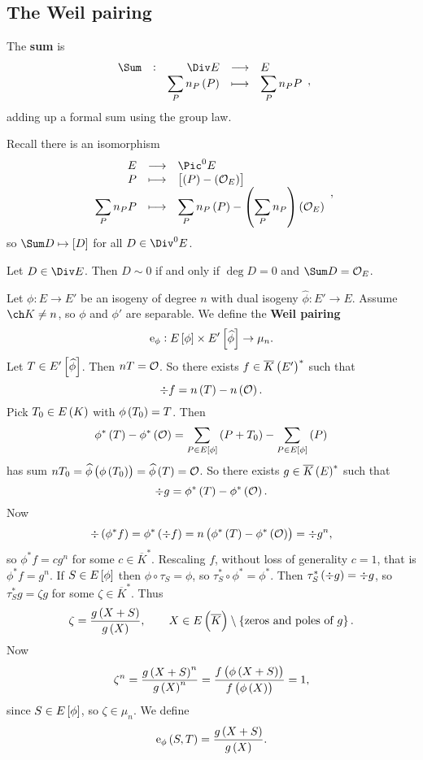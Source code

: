 \pagebreak

\subsection{The Weil pairing}


\begin{definition*}
The \textbf{sum} is
$$ \function[\Sum]{\Div E}{E}{\sum_P n_P\br{P}}{\sum_P n_PP}, $$
adding up a formal sum using the group law.
\end{definition*}

Recall there is an isomorphism
$$ \functions{E}{\Pic^0 E}{P}{\sbr{\br{P} - \br{\OOO_E}}}{\sum_P n_PP}{\sum_P n_P\br{P} - \br{\sum_P n_P}\br{\OOO_E}}, $$
so $ \Sum D \mapsto \sbr{D} $ for all $ D \in \Div^0 E $.

\begin{lemma}
Let $ D \in \Div E $. Then $ D \sim 0 $ if and only if $ \deg D = 0 $ and $ \Sum D = \OOO_E $.
\end{lemma}

Let $ \phi : E \to E' $ be an isogeny of degree $ n $ with dual isogeny $ \widehat{\phi} : E' \to E $. Assume $ \ch K \ne n $, so $ \phi $ and $ \phi' $ are separable. We define the \textbf{Weil pairing}
$$ \e_\phi : E\sbr{\phi} \times E'\sbr{\widehat{\phi}} \to \mu_n. $$
Let $ T \in E'\sbr{\widehat{\phi}} $. Then $ nT = \mathcal{O} $. So there exists $ f \in \overline{K}\br{E'}^* $ such that
$$ \div f = n\br{T} - n\br{\OOO}. $$
Pick $ T_0 \in E\br{K} $ with $ \phi\br{T_0} = T $. Then
$$ \phi^*\br{T} - \phi^*\br{\OOO} = \sum_{P \in E\sbr{\phi}} \br{P + T_0} - \sum_{P \in E\sbr{\phi}} \br{P} $$
has sum $ nT_0 = \widehat{\phi}\br{\phi\br{T_0}} = \widehat{\phi}\br{T} = \OOO $. So there exists $ g \in \overline{K}\br{E}^* $ such that
$$ \div g = \phi^*\br{T} - \phi^*\br{\OOO}. $$
Now
$$ \div \br{\phi^*f} = \phi^*\br{\div f} = n\br{\phi^*\br{T} - \phi^*\br{\OOO}} = \div g^n, $$
so $ \phi^*f = cg^n $ for some $ c \in \overline{K}^* $. Rescaling $ f $, without loss of generality $ c = 1 $, that is $ \phi^*f = g^n $. If $ S \in E\sbr{\phi} $ then $ \phi \circ \tau_S = \phi $, so $ \tau_S^* \circ \phi^* = \phi^* $. Then $ \tau_S^*\br{\div g} = \div g $, so $ \tau_S^*g = \zeta g $ for some $ \zeta \in \overline{K}^* $. Thus
$$ \zeta = \dfrac{g\br{X + S}}{g\br{X}}, \qquad X \in E\br{\overline{K}} \setminus \cbr{\text{zeros and poles of} \ g}. $$
Now
$$ \zeta^n = \dfrac{g\br{X + S}^n}{g\br{X}^n} = \dfrac{f\br{\phi\br{X + S}}}{f\br{\phi\br{X}}} = 1, $$
since $ S \in E\sbr{\phi} $, so $ \zeta \in \mu_n $. We define
$$ \e_\phi\br{S, T} = \dfrac{g\br{X + S}}{g\br{X}}. $$

